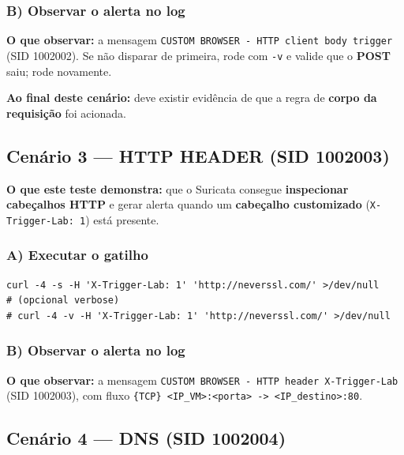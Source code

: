 
\subsubsection*{B) Observar o alerta no log}

\textbf{O que observar:} a mensagem \texttt{CUSTOM BROWSER - HTTP client body trigger} (SID 1002002). Se não disparar de primeira, rode com \texttt{-v} e valide que o \textbf{POST} saiu; rode novamente.

\begin{notebox}
\textbf{Ao final deste cenário:} deve existir evidência de que a regra de \textbf{corpo da requisição} foi acionada.
\end{notebox}

\subsection{Cenário 3 --- HTTP HEADER (SID 1002003)}

\textbf{O que este teste demonstra:} que o Suricata consegue \textbf{inspecionar cabeçalhos HTTP} e gerar alerta quando um \textbf{cabeçalho customizado} (\texttt{X-Trigger-Lab: 1}) está presente.

\subsubsection*{A) Executar o gatilho}

\begin{lstlisting}
curl -4 -s -H 'X-Trigger-Lab: 1' 'http://neverssl.com/' >/dev/null
# (opcional verbose)
# curl -4 -v -H 'X-Trigger-Lab: 1' 'http://neverssl.com/' >/dev/null
\end{lstlisting}


\subsubsection*{B) Observar o alerta no log}

\textbf{O que observar:} a mensagem \texttt{CUSTOM BROWSER - HTTP header X-Trigger-Lab} (SID 1002003), com fluxo \texttt{\{TCP\} <IP\_VM>:<porta> -> <IP\_destino>:80}.

\subsection{Cenário 4 --- DNS (SID 1002004)}

